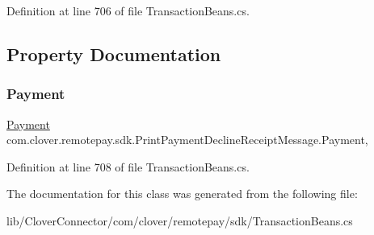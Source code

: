 Definition at line 706 of file Transaction\+Beans.\+cs.



\subsection{Property Documentation}
\mbox{\label{classcom_1_1clover_1_1remotepay_1_1sdk_1_1_print_payment_decline_receipt_message_a8c10fc5bbfe151c7dc1e8f112614fac3}} 
\subsubsection{\texorpdfstring{Payment}{Payment}}
{\footnotesize\ttfamily \hyperlink{classcom_1_1clover_1_1sdk_1_1v3_1_1payments_1_1_payment}{Payment} com.\+clover.\+remotepay.\+sdk.\+Print\+Payment\+Decline\+Receipt\+Message.\+Payment\hspace{0.3cm}{\ttfamily [get]}, {\ttfamily [set]}}



Definition at line 708 of file Transaction\+Beans.\+cs.



The documentation for this class was generated from the following file\+:\begin{DoxyCompactItemize}
\item 
lib/\+Clover\+Connector/com/clover/remotepay/sdk/Transaction\+Beans.\+cs\end{DoxyCompactItemize}
